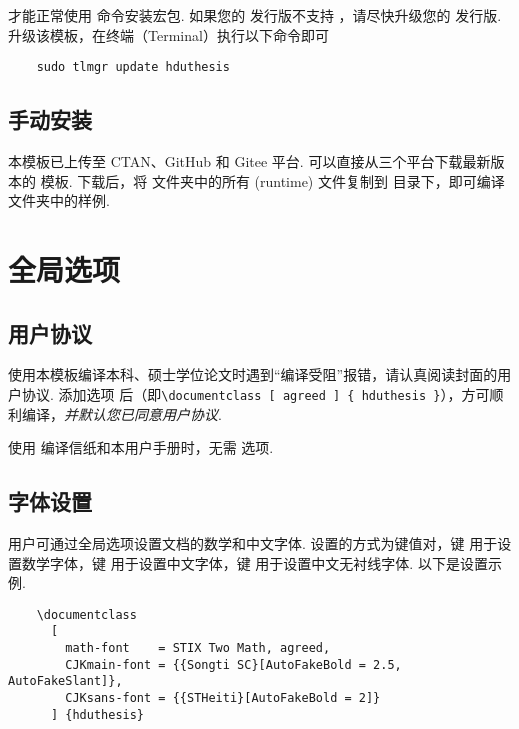 才能正常使用  命令安装宏包.
如果您的  发行版不支持 ，请尽快升级您的  发行版.
升级该模板，在终端（Terminal）执行以下命令即可

\begin{framed}
  \begin{verbatim}
    sudo tlmgr update hduthesis
  \end{verbatim}
\end{framed}

\subsection{手动安装}

本模板已上传至 CTAN、GitHub 和 Gitee 平台. 可以直接从三个平台下载最新版本的  模板. 下载后，将  文件夹中的所有 (runtime) 文件复制到  目录下，即可编译  文件夹中的样例.

\section{全局选项}

\subsection{用户协议}

使用本模板编译本科、硕士学位论文时遇到``编译受阻''报错，请认真阅读封面的用户协议.
添加选项  后（即\verb|\documentclass [ agreed ] { hduthesis }|），方可顺利编译，\emph{并默认您已同意用户协议}.

使用  编译信纸和本用户手册时，无需  选项.

\subsection{字体设置}

用户可通过全局选项设置文档的数学和中文字体. 设置的方式为键值对，键  用于设置数学字体，键  用于设置中文字体，键  用于设置中文无衬线字体. 以下是设置示例.

\begin{framed}
  \begin{verbatim}
    \documentclass
      [
        math-font    = STIX Two Math, agreed,
        CJKmain-font = {{Songti SC}[AutoFakeBold = 2.5, AutoFakeSlant]},
        CJKsans-font = {{STHeiti}[AutoFakeBold = 2]}
      ] {hduthesis}
  \end{verbatim}
\end{framed}

